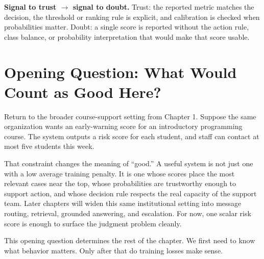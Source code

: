 \begin{thinkingtool}
\textbf{Signal to trust $\rightarrow$ signal to doubt.} Trust: the reported metric matches the decision, the threshold or ranking rule is explicit, and calibration is checked when probabilities matter. Doubt: a single score is reported without the action rule, class balance, or probability interpretation that would make that score usable.
\end{thinkingtool}

\section{Opening Question: What Would Count as Good Here?}

Return to the broader course-support setting from Chapter 1. Suppose the same organization wants an early-warning score for an introductory programming course. The system outputs a risk score for each student, and staff can contact at most five students this week.

That constraint changes the meaning of ``good.'' A useful system is not just one with a low average training penalty. It is one whose scores place the most relevant cases near the top, whose probabilities are trustworthy enough to support action, and whose decision rule respects the real capacity of the support team. Later chapters will widen this same institutional setting into message routing, retrieval, grounded answering, and escalation. For now, one scalar risk score is enough to surface the judgment problem cleanly.

This opening question determines the rest of the chapter. We first need to know what behavior matters. Only after that do training losses make sense.

